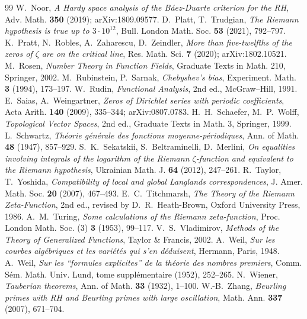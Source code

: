 \begin{thebibliography}{99}
 W.~Noor, \emph{A Hardy space analysis of the Báez-Duarte criterion for the RH}, Adv. Math. \textbf{350} (2019); arXiv:1809.09577.
 D.~Platt, T.~Trudgian, \emph{The Riemann hypothesis is true up to $3\cdot10^{12}$}, Bull. London Math. Soc. \textbf{53} (2021), 792--797.
 K.~Pratt, N.~Robles, A.~Zaharescu, D.~Zeindler, \emph{More than five-twelfths of the zeros of $\zeta$ are on the critical line}, Res. Math. Sci. \textbf{7} (2020); arXiv:1802.10521.
 M.~Rosen, \emph{Number Theory in Function Fields}, Graduate Texts in Math. 210, Springer, 2002.
 M.~Rubinstein, P.~Sarnak, \emph{Chebyshev's bias}, Experiment. Math. \textbf{3} (1994), 173--197.
 W.~Rudin, \emph{Functional Analysis}, 2nd ed., McGraw--Hill, 1991.
 E.~Saias, A.~Weingartner, \emph{Zeros of Dirichlet series with periodic coefficients}, Acta Arith. \textbf{140} (2009), 335--344; arXiv:0807.0783.
 H.~H.~Schaefer, M.~P.~Wolff, \emph{Topological Vector Spaces}, 2nd ed., Graduate Texts in Math. 3, Springer, 1999.
 L.~Schwartz, \emph{Théorie générale des fonctions moyenne-périodiques}, Ann. of Math. \textbf{48} (1947), 857--929.
 S.~K.~Sekatskii, S.~Beltraminelli, D.~Merlini, \emph{On equalities involving integrals of the logarithm of the Riemann $\zeta$-function and equivalent to the Riemann hypothesis}, Ukrainian Math. J. \textbf{64} (2012), 247--261.
 R.~Taylor, T.~Yoshida, \emph{Compatibility of local and global Langlands correspondences}, J. Amer. Math. Soc. \textbf{20} (2007), 467--493.
 E.~C.~Titchmarsh, \emph{The Theory of the Riemann Zeta-Function}, 2nd ed., revised by D.~R.~Heath-Brown, Oxford University Press, 1986.
 A.~M.~Turing, \emph{Some calculations of the Riemann zeta-function}, Proc. London Math. Soc. (3) \textbf{3} (1953), 99--117.
 V.~S.~Vladimirov, \emph{Methods of the Theory of Generalized Functions}, Taylor \& Francis, 2002.
 A.~Weil, \emph{Sur les courbes algébriques et les variétés qui s'en déduisent}, Hermann, Paris, 1948.
 A.~Weil, \emph{Sur les ``formules explicites'' de la théorie des nombres premiers}, Comm. Sém. Math. Univ. Lund, tome supplémentaire (1952), 252--265.
 N.~Wiener, \emph{Tauberian theorems}, Ann. of Math. \textbf{33} (1932), 1--100.
 W.-B.~Zhang, \emph{Beurling primes with RH and Beurling primes with large oscillation}, Math. Ann. \textbf{337} (2007), 671--704.
\end{thebibliography}
